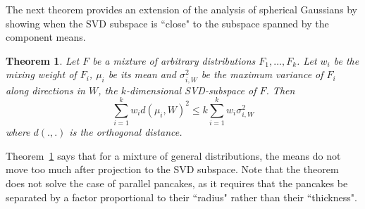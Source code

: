 \documentclass{book}
\newtheorem{theorem}{Theorem}[chapter]
\numberwithin{exercise}{chapter}
\begin{document}

The next theorem provides an extension of the analysis of spherical Gaussians by showing when the SVD subspace is ``close" to the subspace spanned by the component means.

\begin{theorem}\label{thm:genmix}
Let $F$ be a mixture of arbitrary distributions $F_1,\ldots,F_k$. Let $w_i$ be the mixing weight
of $F_i$, $\mu_i$ be its mean and $\sigma^2_{i,W}$ be the maximum variance of $F_i$ along directions in $W$, the $k$-dimensional SVD-subspace of $F$. Then
\[\sum_{i=1}^k w_i d(\mu_i,W)^2 \le k \sum_{i=1}^k w_i \sigma^2_{i,W}\]
where $d(.,.)$ is the orthogonal distance.
\end{theorem}

 Theorem~\ref{thm:genmix} says that for a mixture of general distributions, the means do not move too much after projection
 to the SVD subspace. Note that the theorem does not solve the case of parallel pancakes, as it requires that the pancakes be separated by a factor proportional to their ``radius" rather than their ``thickness".

\end{document}
